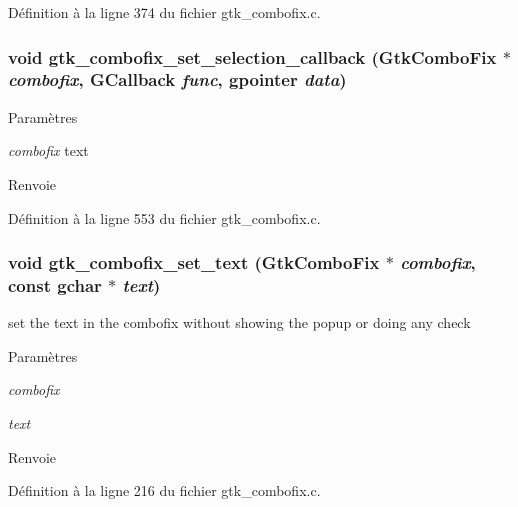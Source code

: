 Définition à la ligne 374 du fichier gtk\_\-combofix.c.

\subsubsection[{gtk\_\-combofix\_\-set\_\-selection\_\-callback}]{\setlength{\rightskip}{0pt plus 5cm}void gtk\_\-combofix\_\-set\_\-selection\_\-callback ({\bf GtkComboFix} $\ast$ {\em combofix}, \/  GCallback {\em func}, \/  gpointer {\em data})}\label{gtk__combofix_8c_aaaedc2affe02e18b822ef9b59254334c}

\begin{DoxyParams}{Paramètres}
\item[{\em combofix}]text\end{DoxyParams}
\begin{DoxyReturn}{Renvoie}

\end{DoxyReturn}


Définition à la ligne 553 du fichier gtk\_\-combofix.c.

\subsubsection[{gtk\_\-combofix\_\-set\_\-text}]{\setlength{\rightskip}{0pt plus 5cm}void gtk\_\-combofix\_\-set\_\-text ({\bf GtkComboFix} $\ast$ {\em combofix}, \/  const gchar $\ast$ {\em text})}\label{gtk__combofix_8c_ac041b5bd83117286152eb388569f137d}
set the text in the combofix without showing the popup or doing any check


\begin{DoxyParams}{Paramètres}
\item[{\em combofix}]\item[{\em text}]\end{DoxyParams}
\begin{DoxyReturn}{Renvoie}

\end{DoxyReturn}


Définition à la ligne 216 du fichier gtk\_\-combofix.c.

